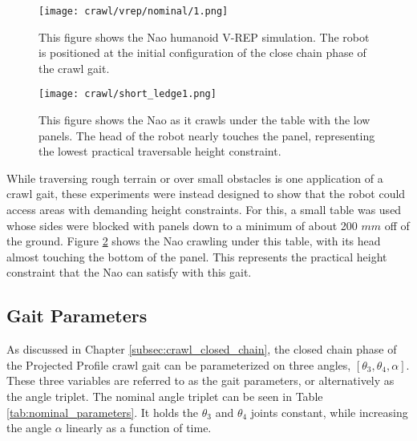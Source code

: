 \begin{figure}
  \centering
  \texttt{[image: crawl/vrep/nominal/1.png]}
  \caption{This figure shows the Nao humanoid V-REP simulation. 
           The robot is positioned at the initial configuration of the close chain phase
           of the crawl gait.}
  \label{fig:vrep_nao_nom_gait_single_frame1}
\end{figure}

\begin{figure}
  \centering
  \texttt{[image: crawl/short\_ledge1.png]}
  \caption{This figure shows the Nao as it crawls under the table with the low panels.
           The head of the robot nearly touches the panel,
           representing the lowest practical traversable height constraint.}
  \label{fig:short_ledge_nao_nom_gait_single_frame1}
\end{figure}

While traversing rough terrain or over small obstacles is one application of a crawl gait,
these experiments were instead designed to show that the robot could access areas with
demanding height constraints. For this, a small table was used whose sides were blocked
with panels down to a minimum of about 200 $mm$ off of the ground. 
Figure \ref{fig:short_ledge_nao_nom_gait_single_frame1} shows the Nao crawling under this table,
with its head almost touching the bottom of the panel. This represents the practical height
constraint that the Nao can satisfy with this gait.


\FloatBarrier
\subsection{Gait Parameters} \label{subsec:gait_params}
As discussed in Chapter \ref{subsec:crawl_closed_chain}, the closed chain phase of the 
Projected Profile crawl gait can be parameterized on three angles, $[\theta_3, \theta_4, \alpha]$.
These three variables are referred to as the gait parameters, or alternatively as the angle triplet.
The nominal angle triplet can be seen in Table \ref{tab:nominal_parameters}. It holds the 
$\theta_3$ and $\theta_4$ joints constant, while increasing the angle $\alpha$ linearly as a function of time.

